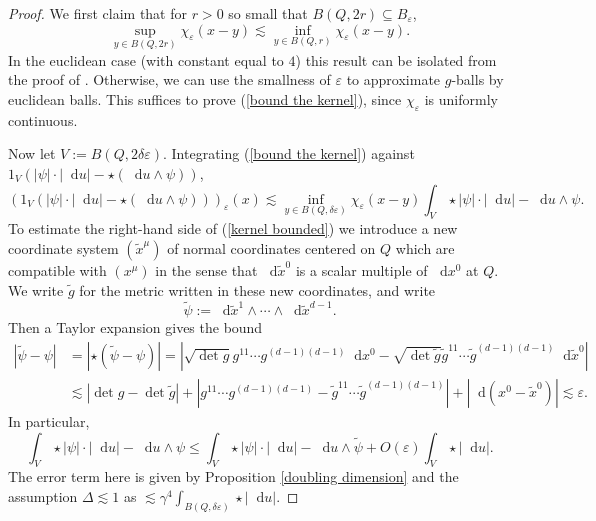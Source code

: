 \documentclass[reqno,12pt,letterpaper]{amsart}
\newcommand*\dif{\mathop{}\!\mathrm{d}}
\theoremstyle{definition}
\numberwithin{equation}{section}
\begin{document}
\begin{proof}
We first claim that for $r > 0$ so small that $B(Q, 2r) \subseteq B_\varepsilon$,
\begin{equation}\label{bound the kernel}
\sup_{y \in B(Q, 2r)} \chi_\varepsilon(x - y) \lesssim \inf_{y \in B(Q, r)} \chi_\varepsilon(x - y).
\end{equation}
In the euclidean case (with constant equal to $4$) this result can be isolated from the proof of \cite[Theorem 7.3]{Giusti77}.
Otherwise, we can use the smallness of $\varepsilon$ to approximate $g$-balls by euclidean balls.
This suffices to prove (\ref{bound the kernel}), since $\chi_\varepsilon$ is uniformly continuous.

Now let $V := B(Q, 2\delta\varepsilon)$.
Integrating (\ref{bound the kernel}) against $1_V(|\psi| \cdot |\dif u| - \star(\dif u \wedge \psi))$,
\begin{equation}\label{kernel bounded}
(1_V(|\psi| \cdot |\dif u| - \star(\dif u \wedge \psi)))_\varepsilon(x) \lesssim \inf_{y \in B(Q, \delta\varepsilon)} \chi_\varepsilon(x - y) \int_V \star |\psi| \cdot |\dif u| - \dif u \wedge \psi.
\end{equation}
To estimate the right-hand side of (\ref{kernel bounded}) we introduce a new coordinate system $(\tilde x^\mu)$ of normal coordinates centered on $Q$ which are compatible with $(x^\mu)$ in the sense that $\dif \tilde x^0$ is a scalar multiple of $\dif x^0$ at $Q$.
We write $\tilde g$ for the metric written in these new coordinates, and write
$$\tilde \psi := \dif \tilde x^1 \wedge \cdots \wedge \dif \tilde x^{d - 1}.$$
Then a Taylor expansion gives the bound
\begin{align}
|\tilde \psi - \psi| &= |\star(\tilde \psi - \psi)| = |\sqrt{\det g} g^{11} \cdots g^{(d-1)(d-1)} \dif x^0 - \sqrt{\det \tilde g} \tilde g^{11} \cdots \tilde g^{(d-1)(d-1)} \dif \tilde x^0|\\
&\lesssim |\det g - \det \tilde g| + |g^{11} \cdots g^{(d-1)(d-1)} - \tilde g^{11} \cdots \tilde g^{(d-1)(d-1)}| + |\dif(x^0 - \tilde x^0)| \lesssim \varepsilon. \label{T vs Ttilde}
\end{align}
In particular,
\begin{equation}\label{split up T Ttilde}
\int_V \star |\psi| \cdot |\dif u| - \dif u \wedge \psi \leq \int_V \star |\psi| \cdot |\dif u| - \dif u \wedge \tilde \psi + O(\varepsilon) \int_V \star |\dif u|.
\end{equation}
The error term here is given by Proposition \ref{doubling dimension} and the assumption $\Delta \lesssim 1$ as $\lesssim \gamma^4 \int_{B(Q, \delta\varepsilon)} \star |\dif u|$.

\end{proof}
\end{document}
